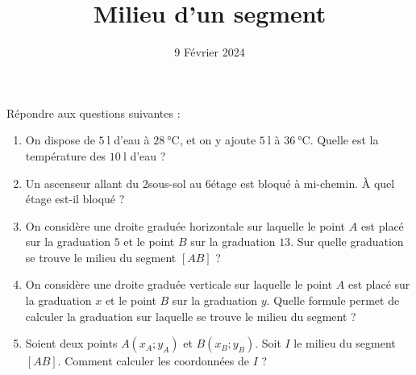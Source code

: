 \documentclass{article}
\title{Milieu d'un segment}
\date{9 Février 2024}
\author{}
\begin{document}
\maketitle
Répondre aux questions suivantes :
\begin{enumerate}
\item On dispose de $\qty{5}{\litre}$ d'eau à $\qty{28}{\degreeCelsius}$, et on y ajoute $\qty{5}{\litre}$ à $\qty{36}{\degreeCelsius}$. Quelle est la température des $\qty{10}{\litre}$ d'eau ?
\item Un ascenseur allant du 2\ieme sous-sol au 6\ieme étage est bloqué à mi-chemin. À quel étage est-il bloqué ?
\item On considère une droite graduée horizontale sur laquelle le point $A$ est placé sur la graduation $5$ et le point $B$ sur la graduation $13$. Sur quelle graduation se trouve le milieu du segment $[AB]$ ?
\item On considère une droite graduée verticale sur laquelle le point $A$ est placé sur la graduation $x$ et le point $B$ sur la graduation $y$. Quelle formule permet de calculer la graduation sur laquelle se trouve le milieu du segment ?
\item Soient deux points $A(x_A;y_A)$ et $B(x_B;y_B)$. Soit $I$ le milieu du segment $[AB]$. Comment calculer les coordonnées de $I$ ?
\end{enumerate}
\end{document}
